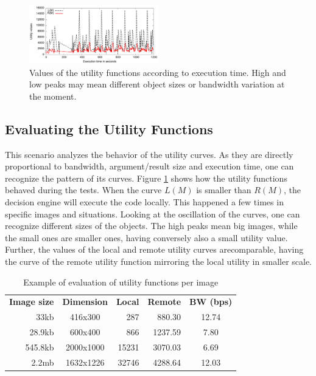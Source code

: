 \documentclass[10pt, conference, letterpaper]{IEEEtran}
\begin{document}

\begin{figure}[t]
  \centering
  \includegraphics[width=0.5\textwidth]{results/plots/utility-fluctuation/executions.png}
  \caption{Values of the utility functions according to execution time. High and low peaks may mean different object sizes or bandwidth variation at the moment.}
  \label{fig:utilityplot}
\end{figure}

\subsection{Evaluating the Utility Functions}
  
This scenario analyzes the behavior of the utility curves.  As they are directly proportional to bandwidth, argument/result size and execution time, one can recognize the pattern of its curves. Figure \ref{fig:utilityplot} shows how the utility functions behaved during the tests. When the curve $L(M)$ is smaller than $R(M)$, the decision engine will execute the code locally. This happened a few times in specific images and situations. Looking at the oscillation of the curves, one can recognize different sizes of the objects. The high peaks mean big images, while the small ones are smaller ones, having conversely also a small utility value. Further,  the values of the local and remote utility curves arecomparable, having the curve of the remote utility function mirroring the local utility in smaller scale. 

  \begin{table}[t]
  \centering
  \caption{Example of evaluation of utility functions per image}
  \label{table:utility}
  \begin{tabular}{rcrrc}
    \textbf{Image size} & \textbf{Dimension} & \textbf{Local} & \textbf{Remote} & \textbf{BW (bps)} \\
   33kb & 416x300 & 287 & 880.30 & 12.74 \\
   28.9kb & 600x400  & 866 & 1237.59 & 7.80 \\
   545.8kb & 2000x1000  & 15231 & 3070.03 & 6.69 \\
   2.2mb & 1632x1226  & 32746 & 4288.64 & 12.03 \\
  \end{tabular}
  \end{table}
\end{document}
